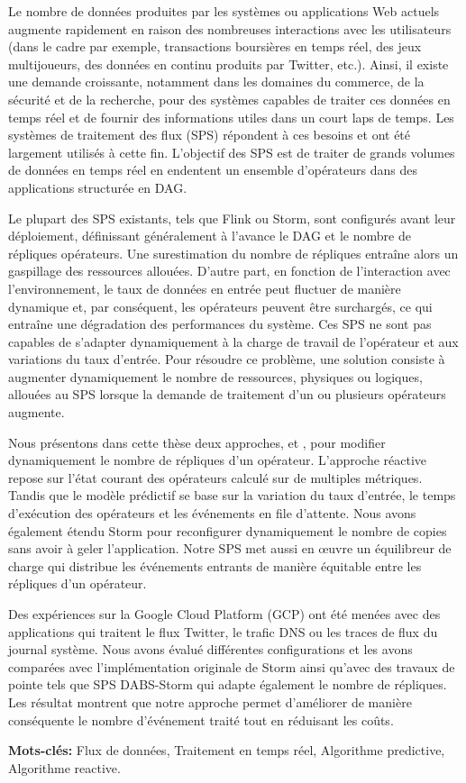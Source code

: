 %
\label{chap:résumé}

Le nombre de données produites par les systèmes ou applications Web actuels augmente rapidement en raison des nombreuses interactions avec les utilisateurs (dans le cadre par exemple, transactions boursières en temps réel, des jeux multijoueurs, des données en continu produits par Twitter, etc.). Ainsi, il existe une demande croissante, notamment dans les domaines du commerce, de la sécurité et de la recherche, pour des systèmes capables de traiter ces données en temps réel et de fournir des informations utiles dans un court laps de temps. Les systèmes de traitement des flux (SPS) répondent à ces besoins et ont été largement utilisés à cette fin. L'objectif des SPS est de traiter de grands volumes de données en temps réel en endentent un ensemble d’opérateurs dans des applications structurée en DAG.

Le plupart des SPS existants, tels que Flink ou Storm, sont configurés avant leur déploiement, définissant généralement à l'avance le DAG et le nombre de répliques opérateurs. Une surestimation du nombre de répliques entraîne alors un gaspillage des ressources allouées. D'autre part, en fonction de l'interaction avec l'environnement, le taux de données en entrée peut fluctuer de manière dynamique et, par conséquent, les opérateurs peuvent être surchargés, ce qui entraîne une dégradation des performances du système. Ces SPS ne sont pas capables de s'adapter dynamiquement à la charge de travail de l'opérateur et aux variations du taux d'entrée.
Pour résoudre ce problème, une solution consiste à augmenter dynamiquement le nombre de ressources, physiques ou logiques, allouées au SPS lorsque la demande de traitement d'un ou plusieurs opérateurs augmente.

Nous présentons dans cette thèse deux approches, \rSPS{} et \pSPS{}, pour modifier dynamiquement le nombre de répliques d'un opérateur. L'approche réactive repose sur l’état courant des opérateurs calculé sur de multiples métriques. Tandis que le modèle prédictif se base sur la variation du taux d'entrée, le temps d'exécution des opérateurs et les événements en file d'attente. 
Nous avons également étendu Storm pour reconfigurer dynamiquement le nombre de copies sans avoir à geler l’application. Notre SPS met aussi en œuvre un équilibreur de charge qui distribue les événements entrants de manière équitable entre les répliques d'un opérateur.

Des expériences sur la Google Cloud Platform (GCP) ont été menées avec des applications qui traitent le flux Twitter, le trafic DNS ou les traces de flux du journal système. Nous avons évalué différentes configurations et les avons comparées avec l'implémentation originale de Storm ainsi qu'avec des travaux de pointe tels que SPS DABS-Storm qui adapte également le nombre de répliques. Les résultat montrent que notre approche permet d’améliorer de manière conséquente le nombre d’événement traité tout en réduisant les coûts.

\textbf{Mots-clés:} 
Flux de données, Traitement en temps réel, Algorithme predictive, Algorithme reactive.